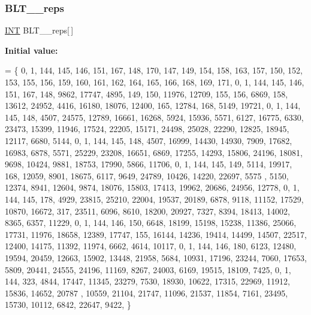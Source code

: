 \mbox{\label{data___b_l_t_8_c_a931eae1dcf9bd8813b2be5c714eaa21c}} 
\subsubsection{\texorpdfstring{B\+L\+T\+\_\+\_\+reps}{BLT\_29\_reps}}
{\footnotesize\ttfamily \mbox{\hyperlink{galois_8h_a09fddde158a3a20bd2dcadb609de11dc}{I\+NT}} B\+L\+T\+\_\+\_\+reps\mbox{[}$\,$\mbox{]}}

{\bfseries Initial value\+:}
\begin{DoxyCode}
= \{
    0, 1, 144, 145, 146, 151, 167, 148, 170, 147, 149, 154, 158, 163, 157, 150, 152, 153, 155, 156, 159, 
      160, 161, 162, 164, 165, 166, 168, 169, 171, 
    0, 1, 144, 145, 146, 151, 167, 148, 9862, 17747, 4895, 149, 150, 11976, 12709, 155, 156, 6869, 158, 
      13612, 24952, 4416, 16180, 18076, 12400, 165, 12784, 168, 5149, 19721, 
    0, 1, 144, 145, 148, 4507, 24575, 12789, 16661, 16268, 5924, 15936, 5571, 6127, 16775, 6330, 23473, 
      15399, 11946, 17524, 22205, 15171, 24498, 25028, 22290, 12825, 18945, 12117, 6680, 5144, 
    0, 1, 144, 145, 148, 4507, 16999, 14430, 14930, 7909, 17682, 16983, 6878, 5571, 25229, 23208, 16651, 
      6869, 17255, 14293, 15806, 24196, 18081, 9698, 10424, 9881, 18753, 17990, 5866, 11706, 
    0, 1, 144, 145, 149, 5114, 19917, 168, 12059, 8901, 18675, 6117, 9649, 24789, 10426, 14220, 22697, 5575
      , 5150, 12374, 8941, 12604, 9874, 18076, 15803, 17413, 19962, 20686, 24956, 12778, 
    0, 1, 144, 145, 178, 4929, 23815, 25210, 22004, 19537, 20189, 6878, 9118, 11152, 17529, 10870, 16672, 
      317, 23511, 6096, 8610, 18200, 20927, 7327, 8394, 18413, 14002, 8365, 6357, 11229, 
    0, 1, 144, 146, 150, 6648, 18199, 15198, 15238, 11386, 25066, 17731, 11976, 18658, 12389, 17747, 155, 
      16144, 14236, 19414, 14499, 14507, 22517, 12400, 14175, 11392, 11974, 6662, 4614, 10117, 
    0, 1, 144, 146, 180, 6123, 12480, 19594, 20459, 12663, 15902, 13448, 21958, 5684, 10931, 17196, 23244, 
      7060, 17653, 5809, 20441, 24555, 24196, 11169, 8267, 24003, 6169, 19515, 18109, 7425, 
    0, 1, 144, 323, 4844, 17447, 11345, 23279, 7530, 18930, 10622, 17315, 22969, 11912, 15836, 14652, 20787
      , 10559, 21104, 21747, 11096, 21537, 11854, 7161, 23495, 15730, 10112, 6842, 22647, 9422, 
\}
\end{DoxyCode}
\mbox{\label{data___b_l_t_8_c_a67d1963e5959fb786946d23a74187657}} 
